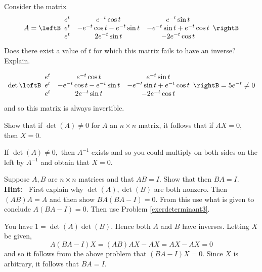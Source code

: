 \begin{enumialphparenastyle}
\begin{ex} Consider the matrix
\begin{equation*} 
A = 
\leftB
\begin{array}{ccc}
e^{t} & e^{-t}\cos t & e^{-t}\sin t \\
e^{t} & -e^{-t}\cos t-e^{-t}\sin t & -e^{-t}\sin t+e^{-t}\cos t \\
e^{t} & 2e^{-t}\sin t & -2e^{-t}\cos t
\end{array}
\rightB
\end{equation*}
Does there exist a value of $t$ for which this matrix fails to have an
inverse? Explain.
\begin{sol}
\[
\det \leftB
\begin{array}{ccc}
e^{t} & e^{-t}\cos t & e^{-t}\sin t \\
e^{t} & -e^{-t}\cos t-e^{-t}\sin t & -e^{-t}\sin t+e^{-t}\cos t \\
e^{t} & 2e^{-t}\sin t & -2e^{-t}\cos t%
\end{array}
\rightB = 5e^{-t} \neq 0
\]
and so this matrix is always invertible.
\end{sol}
\end{ex}

\begin{ex} \label{exerdeterminant3}Show that if $\det \left( A\right) \neq 0$ for $A$
an $n\times n$ matrix, it follows that if $AX=0,$ then $X=0$. 
\begin{sol}
If $\det \left( A\right) \neq 0,$ then $A^{-1}$ exists and so you could
multiply on both sides on the left by $A^{-1}$ and obtain that $X=0$.
\end{sol}
\end{ex}

\begin{ex} Suppose $A,B$ are $n\times n$ matrices and that $AB=I.$ Show that then
$BA=I.$ \textbf{Hint:\ } First explain why
$\det \left( A\right) ,\det \left( B\right) $ are both nonzero. Then $\left(
AB\right) A=A$ and then show $BA\left( BA-I\right) =0.$ From this use what
is given to conclude $A\left( BA-I\right) =0.$ Then use Problem 
\ref{exerdeterminant3}. 
\begin{sol}
You have $1=\det \left( A\right) \det \left( B\right) $.
Hence both $A$ and $B$ have inverses. Letting $X$ be given,
\[
A\left( BA-I\right) X=\left( AB\right) AX-AX=AX-AX = 0
\]
and so it follows from the above problem that $\left( BA-I\right)X=0.$ Since $X$ is arbitrary, it follows that $BA=I.$
\end{sol}
\end{ex}


\end{enumialphparenastyle}
